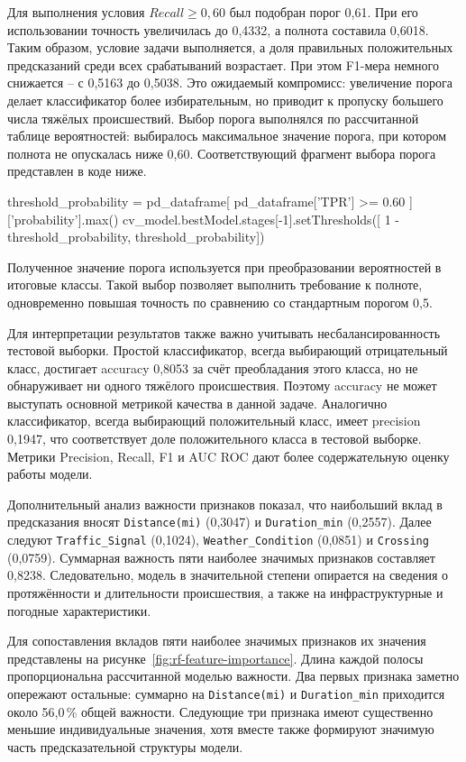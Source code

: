 Для выполнения условия $Recall \geq 0,60$ был подобран порог 0,61. При его использовании точность увеличилась до 0,4332, а полнота составила 0,6018. Таким образом, условие задачи выполняется, а доля правильных положительных предсказаний среди всех срабатываний возрастает. При этом F1-мера немного снижается -- с 0,5163 до 0,5038. Это ожидаемый компромисс: увеличение порога делает классификатор более избирательным, но приводит к пропуску большего числа тяжёлых происшествий. Выбор порога выполнялся по рассчитанной таблице вероятностей: выбиралось максимальное значение порога, при котором полнота не опускалась ниже 0,60. Соответствующий фрагмент выбора порога представлен в коде ниже.

\begin{code}
threshold_probability = pd_dataframe[
    pd_dataframe['TPR'] >= 0.60
]['probability'].max()
cv_model.bestModel.stages[-1].setThresholds([
    1 - threshold_probability,
    threshold_probability])
\end{code}

Полученное значение порога используется при преобразовании вероятностей в итоговые классы. Такой выбор позволяет выполнить требование к полноте, одновременно повышая точность по сравнению со стандартным порогом 0,5.

Для интерпретации результатов также важно учитывать несбалансированность тестовой выборки. Простой классификатор, всегда выбирающий отрицательный класс, достигает accuracy 0,8053 за счёт преобладания этого класса, но не обнаруживает ни одного тяжёлого происшествия. Поэтому accuracy не может выступать основной метрикой качества в данной задаче. Аналогично классификатор, всегда выбирающий положительный класс, имеет precision 0,1947, что соответствует доле положительного класса в тестовой выборке. Метрики Precision, Recall, F1 и AUC ROC дают более содержательную оценку работы модели.

Дополнительный анализ важности признаков показал, что наибольший вклад в предсказания вносят \texttt{Distance(mi)} (0,3047) и \texttt{Duration\_min} (0,2557). Далее следуют \texttt{Traffic\_Signal} (0,1024), \texttt{Weather\_Condition} (0,0851) и \texttt{Crossing} (0,0759). Суммарная важность пяти наиболее значимых признаков составляет 0,8238. Следовательно, модель в значительной степени опирается на сведения о протяжённости и длительности происшествия, а также на инфраструктурные и погодные характеристики.

Для сопоставления вкладов пяти наиболее значимых признаков их значения представлены на рисунке~\ref{fig:rf-feature-importance}. Длина каждой полосы пропорциональна рассчитанной моделью важности. Два первых признака заметно опережают остальные: суммарно на \texttt{Distance(mi)} и \texttt{Duration\_min} приходится около 56,0\,\% общей важности. Следующие три признака имеют существенно меньшие индивидуальные значения, хотя вместе также формируют значимую часть предсказательной структуры модели.


